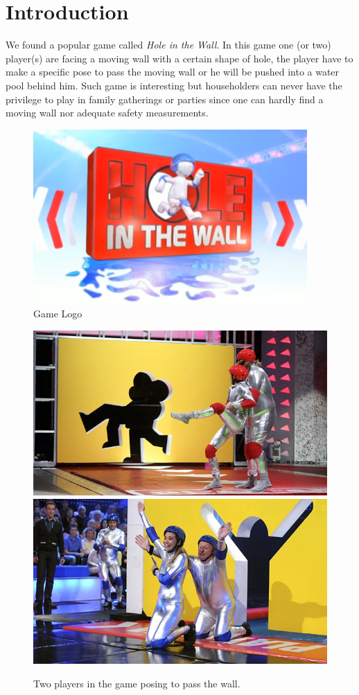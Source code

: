 \documentclass[conference,compsoc]{IEEEtran}
\begin{document}
\section{Introduction}
	\par
		We found a popular game called \textit{Hole in the Wall}. In this game one (or two) player(s) are facing a moving wall with a certain shape of hole, the player have to make a specific pose to pass the moving wall or he will be pushed into a water pool behind him.
		Such game is interesting but householders can never have the privilege to play in family gatherings or parties since one can hardly find a moving wall nor adequate safety measurements.
		\begin{figure}[h]
			\centering
			\includegraphics[width=0.8\linewidth]{./Pic/HIW_Logo}
			\caption{Game Logo}
		\end{figure}
		\begin{figure}[h]
			\centering
			\includegraphics[width=0.45\linewidth]{./Pic/HIW_RedTeam}
			\includegraphics[width=0.45\linewidth]{./Pic/HIW_BlueTeam}
			\caption{Two players in the game posing to pass the wall.}
		\end{figure}
	\par
\end{document}
